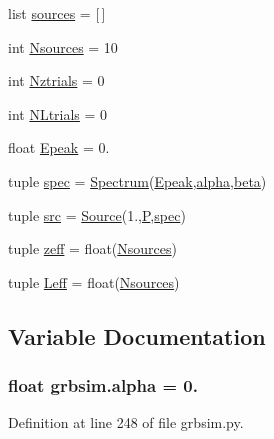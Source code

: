 \begin{DoxyCompactItemize}
\item 
list \hyperlink{namespacegrbsim_aec1771af1de2cff8dfc4ca1a09d80673}{sources} = \mbox{[}$\,$\mbox{]}
\item 
int \hyperlink{namespacegrbsim_af7ec521c0ad959b19ac7a6629547f3c7}{Nsources} = 10
\item 
int \hyperlink{namespacegrbsim_a2206c89978aa1d0492c4d6deee805cd6}{Nztrials} = 0
\item 
int \hyperlink{namespacegrbsim_af3a00b7a4b776e0f905fee9cd3412130}{N\-Ltrials} = 0
\item 
float \hyperlink{namespacegrbsim_ac4e8aebc939db206d2bf1aa8746e809f}{Epeak} = 0.
\item 
tuple \hyperlink{namespacegrbsim_a49758929db0a08e363270d0ba42d9847}{spec} = \hyperlink{classgrbsim_1_1_spectrum}{Spectrum}(\hyperlink{namespacegrbsim_ac4e8aebc939db206d2bf1aa8746e809f}{Epeak},\hyperlink{namespacegrbsim_a1cddfb278523caef508cda8170273f5a}{alpha},\hyperlink{namespacegrbsim_a057e0c49b2a8f4242d3873363f85a4f6}{beta})
\item 
tuple \hyperlink{namespacegrbsim_af976d314256398df4c23c6ef57c3a459}{src} = \hyperlink{classgrbsim_1_1_source}{Source}(1.,\hyperlink{namespacegrbsim_a6ad6e8e40932a7008d72c4ea47741199}{P},\hyperlink{namespacegrbsim_a49758929db0a08e363270d0ba42d9847}{spec})
\item 
tuple \hyperlink{namespacegrbsim_a3ccaa74e7ed0d8956078990201ccdbe4}{zeff} = float(\hyperlink{namespacegrbsim_af7ec521c0ad959b19ac7a6629547f3c7}{Nsources})
\item 
tuple \hyperlink{namespacegrbsim_ae42e5cb04bc80b1e6619262c20af25ab}{Leff} = float(\hyperlink{namespacegrbsim_af7ec521c0ad959b19ac7a6629547f3c7}{Nsources})
\end{DoxyCompactItemize}


\subsection{Variable Documentation}
\hypertarget{namespacegrbsim_a1cddfb278523caef508cda8170273f5a}{
\subsubsection[{alpha}]{\setlength{\rightskip}{0pt plus 5cm}float grbsim.\-alpha = 0.}}\label{namespacegrbsim_a1cddfb278523caef508cda8170273f5a}


Definition at line 248 of file grbsim.\-py.

